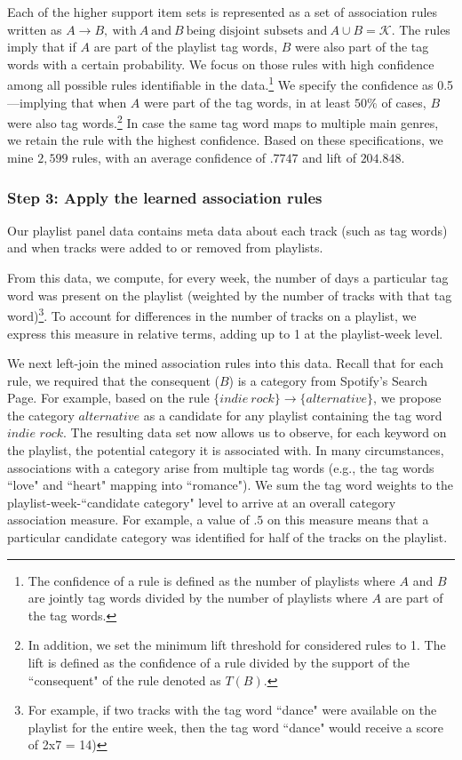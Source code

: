 \documentclass[12pt, a4paper, leqno]{article}
\begin{document}
Each of the higher support item sets is represented as a set of association rules written as 
$A \rightarrow B, \ \text{with}\ A \ \text{and}\ B\ \text{being disjoint subsets and}\ A  \cup B = \mathcal{K}$. The rules imply that if $A$ are part of the playlist tag words, $B$ were also part of the tag words with a certain probability. We focus on those rules with high confidence among all possible rules identifiable in the data.\footnote{The confidence of a rule is defined as the number of playlists where $A$ and $B$ are jointly tag words divided by the number of playlists where $A$ are part of the tag words.} We specify the confidence as 0.5---implying that when $A$ were part of the tag words, in at least $50\%$ of cases, $B$ were also tag words.\footnote{In addition, we set the minimum lift threshold for considered rules to 1. The lift is defined as the confidence of a rule divided by the support of the ``consequent" of the rule denoted as $T(B)$.} In case the same tag word maps to multiple main genres, we retain the rule with the highest confidence.
Based on these specifications, we mine $2,599$ rules, with an average confidence of $.7747$ and lift of $204.848$.

\subsubsection*{Step 3: Apply the learned association rules}

Our playlist panel data contains meta data about each track (such as tag words) and when tracks were added to or removed from playlists.

From this data, we compute, for every week, the number of days a particular tag word was present on the playlist (weighted by the number of tracks with that tag word)\footnote{For example, if two tracks with the tag word ``dance" were available on the playlist for the entire week, then the tag word ``dance" would receive a score of 2x7 = 14)}. To account for differences in the number of tracks on a playlist, we express this measure in relative terms, adding up to 1 at the playlist-week level.

We next left-join the mined association rules into this data. Recall that for each rule, we required that the consequent ($B$) is a category from Spotify's Search Page. For example, based on the rule $\{indie\ rock\} \rightarrow  \{alternative\}$, we propose the category $alternative$ as a candidate for any playlist containing the tag word $indie$ $rock$. The resulting data set now allows us to observe, for each keyword on the playlist, the potential category it is associated with. In many circumstances, associations with a category arise from multiple tag words (e.g., the tag words ``love" and ``heart" mapping into ``romance"). We sum the tag word weights to the playlist-week-``candidate category" level to arrive at an overall category association measure. For example, a value of $.5$ on this measure means that a particular candidate category was identified for half of the tracks on the playlist.
\end{document}
